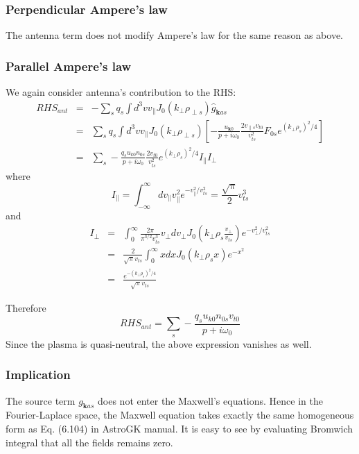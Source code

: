 \documentclass[12pt]{article}
\begin{document}
\subsubsection{Perpendicular Ampere's law}
The antenna term does not modify Ampere's law for the same reason as above.

\subsubsection{Parallel Ampere's law}
We again consider antenna's contribution to the RHS:
%
\begin{eqnarray}
RHS_{ant} &=& -\sum_s q_s \int d^3 v  v_\parallel J_0(k_\perp \rho_{\perp s}) \hat{g}_{\mathbf{k}as} \nonumber \\
&=& \sum_s q_s \int d^3 v  v_\parallel J_0(k_\perp \rho_{\perp s}) \left[ -\frac{u_{\mathbf{k}0}}{p+i\omega_0} \frac{2 v_{\parallel s} v_{t0}}{v_{ts}^2} F_{0s} e^{(k_\perp \rho_s)^2/4}\right] \nonumber \\
&=&\sum_s -\frac{q_s u_{k0} n_{0s}}{p+i\omega_0} \frac{2v_{t0}}{v_{ts}^2} e^{(k_\perp \rho_s)^2/4} I_\parallel I_\perp
\end{eqnarray}
where
%
\begin{equation}
I_\parallel = \int_{-\infty}^{\infty} dv_\parallel v_\parallel^2 e^{-v_\parallel^2 /v_{ts}^2} = \frac{\sqrt{\pi}}{2} v_{ts}^3
\end{equation}
and
%
\begin{eqnarray}
I_\perp &=& \int_0^{\infty} \frac{2\pi} {\pi^{3/2} v_{ts}^3} v_\perp d v_\perp J_0\left( k_\perp \rho_s \frac{v_\perp}{v_{ts}}\right) e^{-v_\perp^2 / v_{ts}^2} \nonumber \\
&=& \frac{2}{\sqrt{\pi} v_{ts}} \int_0^{\infty} x dx J_0(k_\perp \rho_s x) e^{-x^2} \nonumber \\
&=& \frac{e^{-(k_\perp \rho_s)^2/4}}{\sqrt{\pi} v_{ts}}
\label{eq:i_perp_1}
\end{eqnarray}

Therefore
\begin{equation}
RHS_{ant} = \sum_s - \frac{q_s u_{k0} n_{0s} v_{t0}}{p+ i\omega_0}
\end{equation}
Since the plasma is quasi-neutral, the above expression vanishes as well.

\subsubsection{Implication}
The source term $g_{\mathbf{k}as}$ does not enter the Maxwell's equations. Hence in the Fourier-Laplace space, the Maxwell equation takes exactly the same homogeneous form as Eq. (6.104) in AstroGK manual. It is easy to see by evaluating Bromwich integral that all the fields remains zero. 
\end{document}
